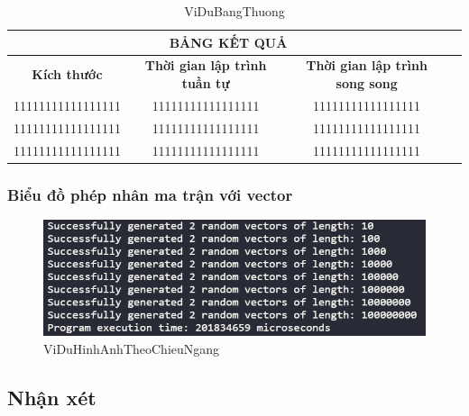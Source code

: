  
\begin{table}[h] %
 \centering
 \begin{tabular}{|c|c|c|c|}
 
 \hline
 \multicolumn{3}{|c|}{\textbf{BẢNG KẾT QUẢ}} \\ 
 \hline
 \textbf{Kích thước} & \textbf{Thời gian lập trình tuần tự} & \textbf{Thời gian lập trình song song} \\ \hline
 11111111111111111 & 11111111111111111 & 11111111111111111 \\ \hline
 11111111111111111 & 11111111111111111 & 11111111111111111 \\ \hline
 11111111111111111 & 11111111111111111 & 11111111111111111 \\ \hline
 \end{tabular}

 \caption{ViDuBangThuong} %
 \label{table:nghia1} %
 \end{table} 
 
 
 
\subsubsection{Biểu đồ phép nhân ma trận với vector}

 
\begin{figure}[h] %
 \centering
 \includegraphics[width=1\textwidth]{pictures/image.png} %
 \caption{ViDuHinhAnhTheoChieuNgang} %
 \label{pictures:nghia12} %
 \end{figure} 
 

\subsection{Nhận xét}
\lipsum[1]



